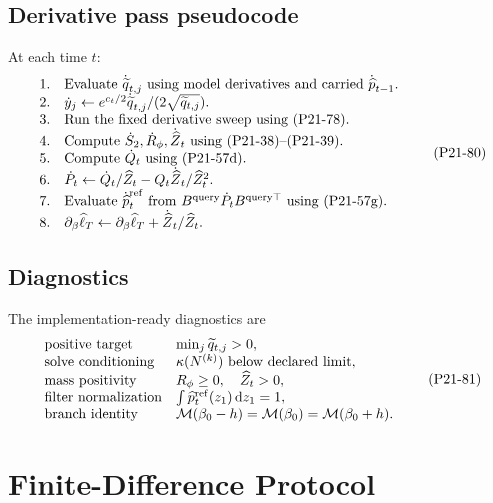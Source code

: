 \documentclass[11pt]{article}
\newcommand{\dd}{\,\mathrm d}
\newcommand{\widehatell}{\widehat\ell}
\newcommand{\widehatZ}{\widehat Z}
\newcommand{\widehatp}{\widehat p}
\begin{document}
\subsection{Derivative pass pseudocode}

At each time \(t\):
\[
\begin{array}{ll}
1. & \text{Evaluate } \dot{\widetilde q}_{t,j}
     \text{ using model derivatives and carried } \dot{\widehatp}_{t-1}.\\
2. & \dot y_j\leftarrow
     e^{c_t/2}\dot{\widetilde q}_{t,j}/(2\sqrt{\widetilde q_{t,j}}).\\
3. & \text{Run the fixed derivative sweep using (P21-78).}\\
4. & \text{Compute } \dot S_2,\dot R_\phi,\dot{\widehatZ}_t
     \text{ using (P21-38)--(P21-39).}\\
5. & \text{Compute } \dot Q_t \text{ using (P21-57d).}\\
6. & \dot P_t\leftarrow
     \dot Q_t/\widehatZ_t-Q_t\dot{\widehatZ}_t/\widehatZ_t^2.\\
7. & \text{Evaluate }\dot{\widehatp}_t^{\rm ref}
     \text{ from }B^{\rm query}\dot P_tB^{\rm query\top}
     \text{ using (P21-57g).}\\
8. & \partial_\beta\widehatell_T\leftarrow
     \partial_\beta\widehatell_T+\dot{\widehatZ}_t/\widehatZ_t.
\end{array}
\tag{P21-80}
\]

\subsection{Diagnostics}

The implementation-ready diagnostics are
\[
\begin{array}{ll}
\text{positive target} & \min_j\widetilde q_{t,j}>0,\\
\text{solve conditioning} & \kappa(N^{(k)})\ \text{below declared limit},\\
\text{mass positivity} & R_\phi\ge0,\quad \widehatZ_t>0,\\
\text{filter normalization} & \int \widehatp_t^{\rm ref}(z_1)\dd z_1=1,\\
\text{branch identity} & \mathcal M(\beta_0-h)=\mathcal M(\beta_0)=\mathcal M(\beta_0+h).
\end{array}
\tag{P21-81}
\]

\section{Finite-Difference Protocol}
\end{document}

